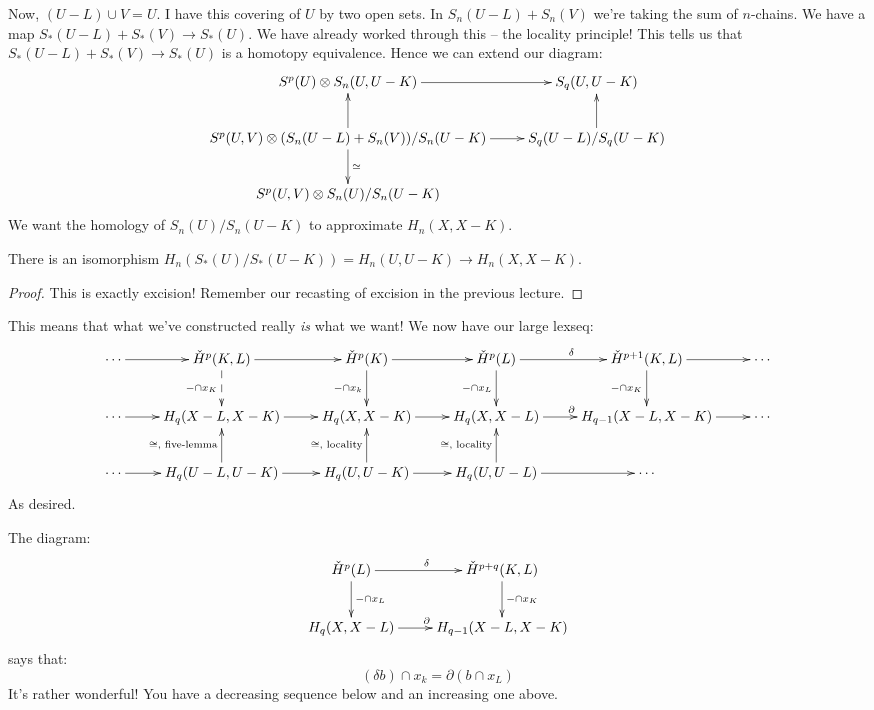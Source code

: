 Now, $(U-L)\cup V=U$. I have this covering of $U$ by two open sets. In $S_n(U-L)+S_n(V)$ we're taking the sum of $n$-chains. We have a map $S_\ast(U-L)+S_\ast(V)\to S_\ast(U)$. We have already worked through this -- the locality principle! This tells us that $S_\ast(U-L)+S_\ast(V)\to S_\ast(U)$ is a homotopy equivalence. Hence we can extend our diagram:
\begin{equation*}
\xymatrix{
	S^p(U)\otimes S_n(U,U-K)\ar[r] & S_q(U,U-K)\\
	S^p(U,V)\otimes (S_n(U-L)+S_n(V))/S_n(U-K)\ar[r]\ar[d]^{\simeq}\ar[u] & S_q(U-L)/S_q(U-K)\ar[u]\\
	S^p(U,V)\otimes S_n(U)/S_n(U-K) & 
}
\end{equation*}
We want the homology of $S_n(U)/S_n(U-K)$ to approximate $H_n(X,X-K)$.
\begin{claim}
There is an isomorphism $H_n(S_\ast(U)/S_\ast(U-K))=H_n(U,U-K)\to H_n(X,X-K)$.
\end{claim}
\begin{proof}
This is exactly excision! Remember our recasting of excision in the previous lecture.
\end{proof}
This means that what we've constructed really \emph{is} what we want! We now have our large lexseq:
\begin{equation*}
\xymatrix{
	\cdots\ar[r] & \cHH^p(K,L)\ar[r]\ar@{-->}[d]_{-\cap x_{K}} & \cHH^p(K)\ar[r]\ar[d]_{-\cap x_k} & \cHH^p(L)\ar[r]^\delta\ar[d]_{-\cap x_L} & \cHH^{p+1}(K,L)\ar[r]\ar[d]_{-\cap x_{K}} & \cdots\\
	\cdots\ar[r] & H_q(X-L,X-K)\ar[r]& H_q(X,X-K)\ar[r] & H_q(X,X-L)\ar[r]^\partial & H_{q-1}(X-L,X-K)\ar[r] & \cdots\\
	\cdots\ar[r] & H_q(U-L,U-K)\ar[r]\ar[u]^{\cong,\text{ five-lemma}} & H_q(U,U-K)\ar[r]\ar[u]^{\cong,\text{ locality}} & H_q(U,U-L)\ar[r]\ar[u]^{\cong,\text{ locality}} & \cdots
}
\end{equation*}
As desired.

The diagram:
\begin{equation*}
\xymatrix{
	\cHH^p(L)\ar[r]^\delta\ar[d]^{-\cap x_L} & \cHH^{p+q}(K,L)\ar[d]^{-\cap x_K}\\
	H_q(X,X-L)\ar[r]^{\partial} & H_{q-1}(X-L,X-K)
}
\end{equation*}
says that:
\begin{equation*}
(\delta b)\cap x_k=\partial(b\cap x_L)
\end{equation*}
It's rather wonderful! You have a decreasing sequence below and an increasing one above.

